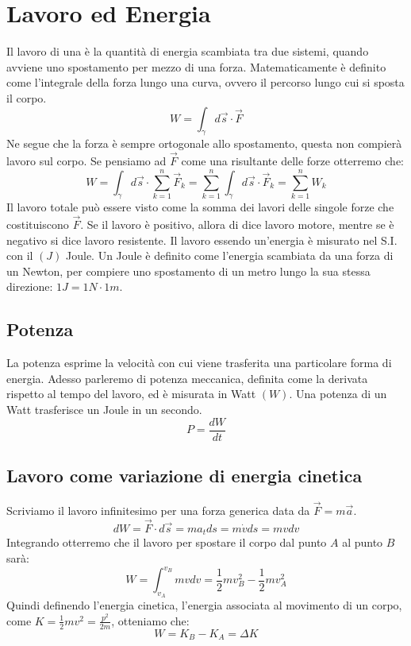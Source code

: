 \section{Lavoro ed Energia}
Il lavoro di una è la quantità di energia scambiata tra due sistemi,
quando avviene uno spostamento per mezzo di una forza. Matematicamente è
definito come l'integrale della forza lungo una curva, ovvero il percorso
lungo cui si sposta il corpo.
\begin{equation}
    \boxed{W = \int_\gamma d\vec s \cdot \vec F}
\label{eq:work&energy:work_def}
\end{equation}
Ne segue che la forza è sempre ortogonale allo spostamento, questa non
compierà lavoro sul corpo. Se pensiamo ad $\vec F$ come una risultante
delle forze otterremo che:
\begin{equation}
    W =  \int_\gamma d\vec s \cdot \sum_{k=1}^n\vec F_k =
    \sum_{k=1}^n \int_\gamma d\vec s \cdot \vec F_k = \sum_{k=1}^n W_k
\label{eq:work&energy:work_sum}
\end{equation}
Il lavoro totale può essere visto come la somma dei lavori delle singole
forze che costituiscono $\vec F$.
Se il lavoro è positivo, allora di dice lavoro motore, mentre se è negativo
si dice lavoro resistente.
Il lavoro essendo un'energia è misurato nel S.I. con il $(J)$ Joule.
Un Joule è definito come l'energia scambiata da una forza di un Newton, per
compiere uno spostamento di un metro lungo la sua stessa direzione:
$1J = 1N\cdot 1 m$. 
\subsection{Potenza}
La potenza esprime la velocità con cui viene trasferita una particolare forma
di energia. Adesso parleremo di potenza meccanica, definita come la derivata
rispetto al tempo del lavoro, ed è misurata in Watt $(W)$.
Una potenza di un Watt trasferisce un Joule in un secondo.
\begin{equation}
    \boxed{P=\frac{dW}{dt}}
\label{eq:work&energy:power_def}
\end{equation}
\subsection{Lavoro come variazione di energia cinetica}
Scriviamo il lavoro infinitesimo per una forza generica data da
$\vec F = m\vec a$.
\begin{equation}
    dW = \vec F\cdot d\vec s = ma_tds = m\dot v ds = mv dv 
\end{equation}
Integrando otterremo che il lavoro per spostare il corpo dal punto $A$ al
punto $B$ sarà:
\begin{equation}
    W = \int_{v_A}^{v_B}mvdv = \frac12mv_B^2- \frac12mv_A^2
\end{equation}
Quindi definendo l'energia cinetica, l'energia associata al movimento di un
corpo, come $K = \frac12 mv^2=\frac{p^2}{2m}$, otteniamo che:
\begin{equation}
    W = K_B - K_A = \Delta K
\label{eq:work&energy:w=dk}
\end{equation}
